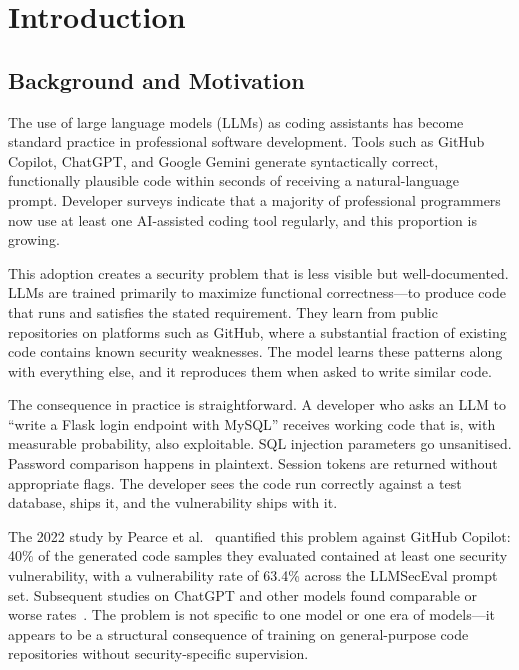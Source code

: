 \documentclass[12pt,a4paper]{report}
\begin{document}
\setcounter{page}{8}   %

\chapter{Introduction}
\label{ch:introduction}

\section{Background and Motivation}
\label{sec:background}

The use of large language models (LLMs) as coding assistants has become
standard practice in professional software development. Tools such as GitHub
Copilot, ChatGPT, and Google Gemini generate syntactically correct, functionally
plausible code within seconds of receiving a natural-language prompt. Developer
surveys indicate that a majority of professional programmers now use at least one
AI-assisted coding tool regularly, and this proportion is growing.

This adoption creates a security problem that is less visible but well-documented.
LLMs are trained primarily to maximize functional correctness---to produce code
that runs and satisfies the stated requirement. They learn from public repositories
on platforms such as GitHub, where a substantial fraction of existing code contains
known security weaknesses. The model learns these patterns along with everything
else, and it reproduces them when asked to write similar code.

The consequence in practice is straightforward. A developer who asks an LLM to
``write a Flask login endpoint with MySQL'' receives working code that is, with
measurable probability, also exploitable. SQL injection parameters go unsanitised.
Password comparison happens in plaintext. Session tokens are returned without
appropriate flags. The developer sees the code run correctly against a test
database, ships it, and the vulnerability ships with it.

The 2022 study by Pearce et al.~\cite{pearce2022asleep} quantified this problem
against GitHub Copilot: 40\% of the generated code samples they evaluated
contained at least one security vulnerability, with a vulnerability rate of 63.4\%
across the LLMSecEval prompt set. Subsequent studies on ChatGPT and other models
found comparable or worse rates~\cite{khoury2023secure,tony2023llmseceval}. The
problem is not specific to one model or one era of models---it appears to be a
structural consequence of training on general-purpose code repositories without
security-specific supervision.
\end{document}
